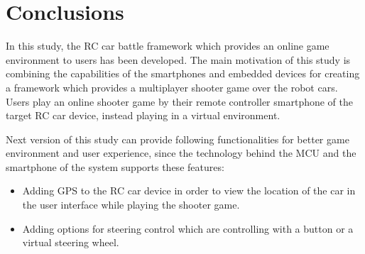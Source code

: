 \chapter{Conclusions}
In this study, the RC car battle framework which provides an online game environment to users has been developed. The main motivation of this study is combining the capabilities of the smartphones and embedded devices for creating a framework which provides a multiplayer shooter game over the robot cars. Users play an online shooter game by their remote controller smartphone of the target RC car device, instead playing in a virtual environment.

Next version of this study can provide following functionalities for better game environment and user experience, since the technology behind the MCU and the smartphone of the system supports these features:

\begin{itemize}
    \item Adding GPS to the RC car device in order to view the location of the car in the user interface while playing the shooter game.
    \item Adding options for steering control which are controlling with a button or a virtual steering wheel.
\end{itemize}

